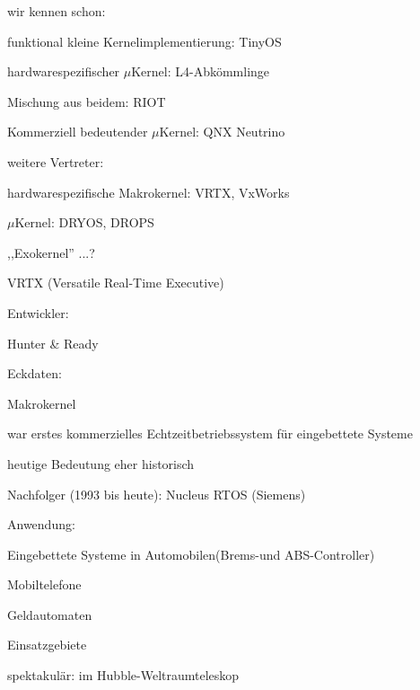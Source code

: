 \documentclass[a4paper]{article}
\begin{document}
\begin{multicols}{3}
    \begin{itemize*}
        \item
        wir kennen schon:
        \begin{itemize*}
            \item funktional kleine Kernelimplementierung: TinyOS
            \item hardwarespezifischer $\mu$Kernel: L4-Abkömmlinge
            \item Mischung aus beidem: RIOT
            \item Kommerziell bedeutender $\mu$Kernel: QNX Neutrino
        \end{itemize*}
        \item
        weitere Vertreter:
        \begin{itemize*}
            \item hardwarespezifische Makrokernel: VRTX, VxWorks
            \item $\mu$Kernel: DRYOS, DROPS
            \item ,,Exokernel'' ...?
        \end{itemize*}
    \end{itemize*}

    VRTX (Versatile Real-Time Executive)

    \begin{itemize*}
        \item
        Entwickler:
        \begin{itemize*}
            \item Hunter \& Ready
        \end{itemize*}
        \item
        Eckdaten:
        \begin{itemize*}
            \item Makrokernel
            \item war erstes kommerzielles Echtzeitbetriebssystem für eingebettete Systeme
            \item heutige Bedeutung eher historisch
            \item Nachfolger (1993 bis heute): Nucleus RTOS (Siemens)
        \end{itemize*}
        \item
        Anwendung:
        \begin{itemize*}
            \item Eingebettete Systeme in Automobilen(Brems-und ABS-Controller)
            \item Mobiltelefone
            \item Geldautomaten
        \end{itemize*}
        \item
        Einsatzgebiete
        \begin{itemize*}
            \item spektakulär: im Hubble-Weltraumteleskop
        \end{itemize*}
    \end{itemize*}


\end{multicols}
\end{document}
